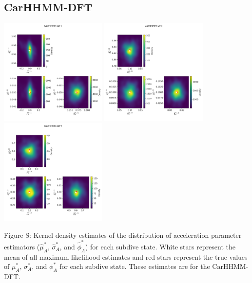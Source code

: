 \documentclass{article}
\begin{document}
        \subsection{CarHHMM-DFT}
        \begin{center}
        \includegraphics[width=2.1in]{../Plots/hhmm_FV_MLE_density_A_0_0.png}
        \includegraphics[width=2.1in]{../Plots/hhmm_FV_MLE_density_A_0_1.png}
        \includegraphics[width=2.1in]{../Plots/hhmm_FV_MLE_density_A_0_2.png}
        \end{center}
        
        \noindent Figure S: Kernel density estimates of the distribution of acceleration parameter estimators ($\hat \mu^*_A$, $\hat \sigma^*_A$, and $\hat \phi^*_A$) for each subdive state. White stars represent the mean of all maximum likelihood estimates and red stars represent the true values of $\mu^*_A$, $\sigma^*_A$, and $\phi^*_A$ for each subdive state. These estimates are for the CarHHMM-DFT.
        \addtocounter{fignum}{1}
        
\end{document}
